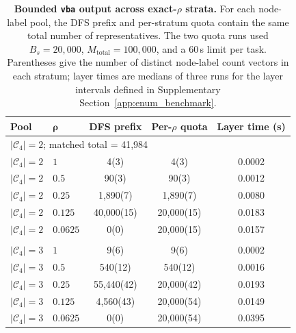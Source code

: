 \documentclass[a5paper, 10pt]{article}
\begin{document}
\begin{table}[H]
\centering
\scriptsize
\setlength{\tabcolsep}{2.5mm}
\renewcommand{\arraystretch}{1.2}
\caption{\textbf{Bounded \texttt{vba} output across exact-$\rho$ strata.} For each node-label pool, the DFS prefix and per-stratum quota contain the same total number of representatives. The two quota runs used $B_s=20{,}000$, $M_{\mathrm{total}}=100{,}000$, and a 60\,s limit per task. Parentheses give the number of distinct node-label count vectors in each stratum; layer times are medians of three runs for the layer intervals defined in Supplementary Section~\ref{app:enum_benchmark}.}
\label{tab:vba_bounded}
\begin{tabular}{llccc}
\toprule
\textbf{Pool} & $\boldsymbol{\rho}$ & \textbf{DFS prefix} & \textbf{Per-$\rho$ quota} & \textbf{Layer time (s)} \\
\midrule
\multicolumn{5}{l}{$|\mathcal{C}_4|=2$; matched total = 41,984} \\
$|\mathcal C_4|=2$ & $1$ & 4\;(3) & 4\;(3) & 0.0002 \\
$|\mathcal C_4|=2$ & $0.5$ & 90\;(3) & 90\;(3) & 0.0012 \\
$|\mathcal C_4|=2$ & $0.25$ & 1,890\;(7) & 1,890\;(7) & 0.0080 \\
$|\mathcal C_4|=2$ & $0.125$ & 40,000\;(15) & 20,000\;(15) & 0.0183 \\
$|\mathcal C_4|=2$ & $0.0625$ & 0\;(0) & 20,000\;(15) & 0.0157 \\
\addlinespace
\multicolumn{5}{l}{$|\mathcal{C}_4|=3$; matched total = 60,549} \\
$|\mathcal C_4|=3$ & $1$ & 9\;(6) & 9\;(6) & 0.0002 \\
$|\mathcal C_4|=3$ & $0.5$ & 540\;(12) & 540\;(12) & 0.0016 \\
$|\mathcal C_4|=3$ & $0.25$ & 55,440\;(42) & 20,000\;(42) & 0.0193 \\
$|\mathcal C_4|=3$ & $0.125$ & 4,560\;(43) & 20,000\;(54) & 0.0149 \\
$|\mathcal C_4|=3$ & $0.0625$ & 0\;(0) & 20,000\;(54) & 0.0395 \\
\bottomrule
\end{tabular}%
\end{table}
\end{document}
